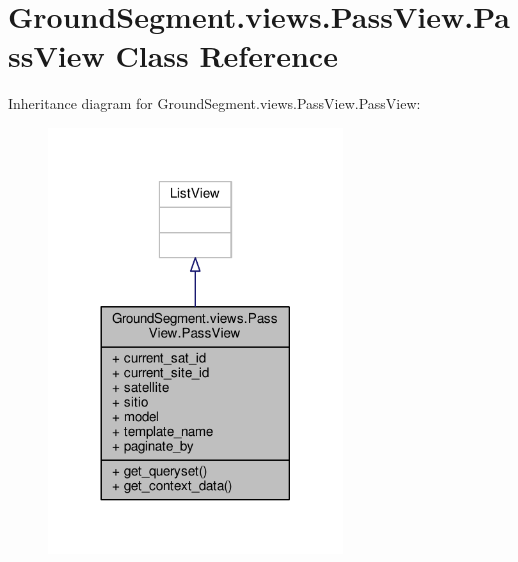 \hypertarget{class_ground_segment_1_1views_1_1_pass_view_1_1_pass_view}{}\section{Ground\+Segment.\+views.\+Pass\+View.\+Pass\+View Class Reference}
\label{class_ground_segment_1_1views_1_1_pass_view_1_1_pass_view}


Inheritance diagram for Ground\+Segment.\+views.\+Pass\+View.\+Pass\+View\+:\nopagebreak
\begin{figure}[H]
\begin{center}
\leavevmode
\includegraphics[width=221pt]{class_ground_segment_1_1views_1_1_pass_view_1_1_pass_view__inherit__graph}
\end{center}
\end{figure}


